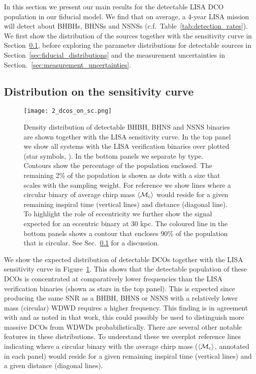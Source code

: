In this section we present our main results for the detectable LISA DCO population in our fiducial model. We find that on average, a 4-year LISA mission will detect about \BHBHFourYear{} BHBHs, \BHNSFourYear{} BHNSs and \NSNSFourYear{} NSNSs (c.f.\ Table~\ref{tab:detection_rates}). We first show the distribution of the sources together with the sensitivity curve in Section~\ref{sec:dcos_on_sc}, before exploring the parameter distributions for detectable sources in Section~\ref{sec:fiducial_distributions} and the measurement uncertainties in Section.~\ref{sec:measurement_uncertainties}.

\subsection{Distribution on the sensitivity curve}\label{sec:dcos_on_sc}

\begin{figure*}[p]
    \centering
    \texttt{[image: 2\_dcos\_on\_sc.png]}
    \caption{Density distribution of detectable BHBH, BHNS and NSNS binaries are shown together with the LISA sensitivity curve. In the top panel we show all systems with the LISA verification binaries over plotted (star symbols, \citealp{Kupfer+2018}). In the bottom panels we separate by type. Contours show the percentage of the population enclosed. The remaining 2\% of the population is shown as dots with a size that scales with the sampling weight. For reference we show lines where a circular binary of average chirp mass $\left\langle\mathcal{M}_c\right\rangle$ would reside for a given remaining inspiral time (vertical lines) and distance (diagonal line). To highlight the role of eccentricity we further show the signal expected for an eccentric binary at 30 kpc. The coloured line in the bottom panels shows a contour that encloses 90\% of the population that is circular. See Sec.~\ref{sec:dcos_on_sc} for a discussion.}
    \label{fig:dcos_on_sc}
\end{figure*}

We show the expected distribution of detectable DCOs together with the LISA sensitivity curve in Figure~\ref{fig:dcos_on_sc}. This shows that the detectable population of these DCOs is concentrated at comparatively lower frequencies than the LISA verification binaries (shown as stars in the top panel). This is expected since producing the same SNR as a BHBH, BHNS or NSNS with a relatively lower mass (circular) WDWD requires a higher frequency. This finding is in agreement with \citet{Sesana+2020} and as noted in that work, this could possibly be used to distinguish more massive DCOs from WDWDs probabilistically. There are several other notable features in these distributions. To understand these we overplot reference lines indicating where a circular binary with the average chirp mass ($\left\langle\mathcal{M}_c\right\rangle$, annotated in each panel) would reside for a given remaining inspiral time (vertical lines) and a given distance (diagonal lines).

